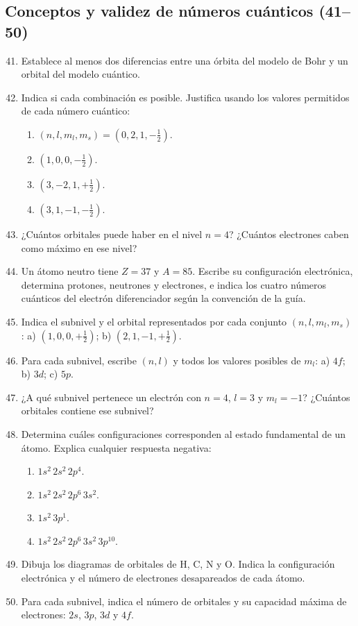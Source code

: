 \documentclass[12pt, letterpaper]{article}
\begin{document}
\subsection{Conceptos y validez de números cuánticos (41--50)}
\begin{enumerate}[leftmargin=*, label=\textbf{\arabic*.}]
  \setcounter{enumi}{40}
  \item \facil{} Establece al menos dos diferencias entre una órbita del modelo de Bohr y un orbital del modelo cuántico.
  \item \medio{} Indica si cada combinación es posible. Justifica usando los valores permitidos de cada número cuántico:
  \begin{enumerate}[label=\alph*)]
    \item $(n,l,m_l,m_s)=(0,2,1,-\tfrac12)$.
    \item $(1,0,0,-\tfrac12)$.
    \item $(3,-2,1,+\tfrac12)$.
    \item $(3,1,-1,-\tfrac12)$.
  \end{enumerate}
  \item \facil{} ¿Cuántos orbitales puede haber en el nivel $n=4$? ¿Cuántos electrones caben como máximo en ese nivel?
  \item \medio{} Un átomo neutro tiene $Z=37$ y $A=85$. Escribe su configuración electrónica, determina protones, neutrones y electrones, e indica los cuatro números cuánticos del electrón diferenciador según la convención de la guía.
  \item \facil{} Indica el subnivel y el orbital representados por cada conjunto $(n,l,m_l,m_s)$: a) $(1,0,0,+\tfrac12)$; b) $(2,1,-1,+\tfrac12)$.
  \item \medio{} Para cada subnivel, escribe $(n,l)$ y todos los valores posibles de $m_l$: a) $4f$; b) $3d$; c) $5p$.
  \item \facil{} ¿A qué subnivel pertenece un electrón con $n=4$, $l=3$ y $m_l=-1$? ¿Cuántos orbitales contiene ese subnivel?
  \item \medio{} Determina cuáles configuraciones corresponden al estado fundamental de un átomo. Explica cualquier respuesta negativa:
  \begin{enumerate}[label=\alph*)]
    \item $1s^2\,2s^2\,2p^4$.
    \item $1s^2\,2s^2\,2p^6\,3s^2$.
    \item $1s^2\,3p^1$.
    \item $1s^2\,2s^2\,2p^6\,3s^2\,3p^{10}$.
  \end{enumerate}
  \item \medio{} Dibuja los diagramas de orbitales de H, C, N y O. Indica la configuración electrónica y el número de electrones desapareados de cada átomo.
  \item \dificil{} Para cada subnivel, indica el número de orbitales y su capacidad máxima de electrones: $2s$, $3p$, $3d$ y $4f$.
\end{enumerate}
\end{document}
